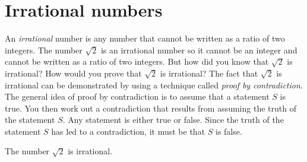 \documentclass[a4paper,oneside,12pt]{article}
\begin{document}



\section{Irrational numbers}

An \emph{irrational} number is any number that cannot be written as a
ratio of two integers.  The number $\sqrt{2}$ is an irrational number
so it cannot be an integer and cannot be written as a ratio of two
integers.  But how did you know that $\sqrt{2}$ is irrational?  How
would you prove that $\sqrt{2}$ is irrational?  The fact that
$\sqrt{2}$ is irrational can be demonstrated by using a technique
called \emph{proof by contradiction}.  The general idea of proof by
contradiction is to assume that a statement $S$ is true.  You then
work out a contradiction that results from assuming the truth of the
statement $S$.  Any statement is either true or false.  Since the
truth of the statement $S$ has led to a contradiction, it must be that
$S$ is false.

\begin{theorem}
The number $\sqrt{2}$ is irrational.
\end{theorem}
\end{document}
